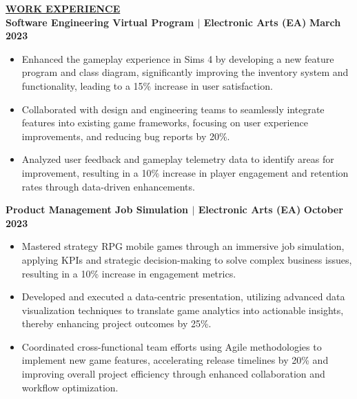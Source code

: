 \documentclass{article}
\begin{document}
\vspace{2mm}

\noindent \textbf{\underline{WORK EXPERIENCE}} \\
\noindent \textbf{Software Engineering Virtual Program $\mid$ Electronic Arts (EA)} \hfill \textbf{March 2023}
\begin{itemize}[noitemsep,nolistsep,leftmargin=*]
    \item {\small Enhanced the gameplay experience in Sims 4 by developing a new feature program and class diagram, significantly improving the inventory system and functionality, leading to a 15\% increase in user satisfaction.}
    \item {\small Collaborated with design and engineering teams to seamlessly integrate features into existing game frameworks, focusing on user experience improvements, and reducing bug reports by 20\%.}
    \item {\small Analyzed user feedback and gameplay telemetry data to identify areas for improvement, resulting in a 10\% increase in player engagement and retention rates through data-driven enhancements.}
\end{itemize}
\vspace{1mm}

\noindent \textbf{Product Management Job Simulation $\mid$ Electronic Arts (EA)} \hfill \textbf{October 2023}
\begin{itemize}[noitemsep,nolistsep,leftmargin=*]
    \item {\small Mastered strategy RPG mobile games through an immersive job simulation, applying KPIs and strategic decision-making to solve complex business issues, resulting in a 10\% increase in engagement metrics.}
    \item {\small Developed and executed a data-centric presentation, utilizing advanced data visualization techniques to translate game analytics into actionable insights, thereby enhancing project outcomes by 25\%.}
    \item {\small Coordinated cross-functional team efforts using Agile methodologies to implement new game features, accelerating release timelines by 20\% and improving overall project efficiency through enhanced collaboration and workflow optimization.}
\end{itemize}
\vspace{1mm}
\end{document}
